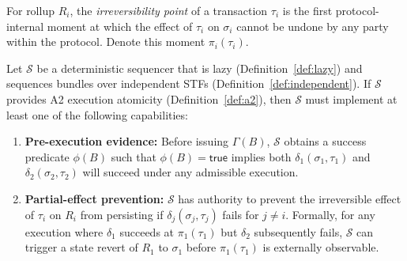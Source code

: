 \begin{definition}
\label{def:irreversibility}
For rollup $R_i$, the \emph{irreversibility point} of a transaction $\tau_i$
is the first protocol-internal moment at which the effect of $\tau_i$ on
$\sigma_i$ cannot be undone by any party within the protocol. Denote this
moment $\pi_i(\tau_i)$.
\end{definition}

\begin{theorem}
\label{thm:a2-necessary}
Let $\mathcal{S}$ be a deterministic sequencer that is lazy
(Definition~\ref{def:lazy}) and sequences bundles over independent STFs
(Definition~\ref{def:independent}). If $\mathcal{S}$ provides A2 execution
atomicity (Definition~\ref{def:a2}), then $\mathcal{S}$ must implement at
least one of the following capabilities:
\begin{enumerate}
  \item[(i)] \textbf{Pre-execution evidence:} Before issuing $\Gamma(B)$,
    $\mathcal{S}$ obtains a success predicate $\phi(B)$ such that
    $\phi(B) = \mathsf{true}$ implies both $\delta_1(\sigma_1, \tau_1)$ and
    $\delta_2(\sigma_2, \tau_2)$ will succeed under any admissible execution.
  \item[(ii)] \textbf{Partial-effect prevention:} $\mathcal{S}$ has authority
    to prevent the irreversible effect of $\tau_i$ on $R_i$ from persisting if
    $\delta_j(\sigma_j, \tau_j)$ fails for $j \neq i$. Formally, for any
    execution where $\delta_1$ succeeds at $\pi_1(\tau_1)$ but $\delta_2$
    subsequently fails, $\mathcal{S}$ can trigger a state revert of $R_1$ to
    $\sigma_1$ before $\pi_1(\tau_1)$ is externally observable.
\end{enumerate}
\end{theorem}

